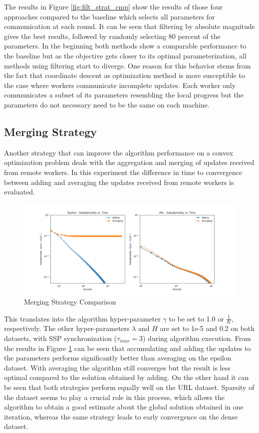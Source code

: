 The results in Figure \ref{fig:filt_strat_cmp} show the results of those four approaches compared to the baseline which selects all parameters for communication at each round.
It can be seen that filtering by absolute magnitude gives the best results, followed by randomly selecting 80 percent of the parameters.
In the beginning both methods show a comparable performance to the baseline but as the objective gets closer to its optimal parameterization, all methods using filtering start to diverge.
One reason for this behavior stems from the fact that coordinate descent as optimization method is more susceptible to the case where workers communicate incomplete updates.
Each worker only communicates a subset of its parameters resembling the local progress but the parameters do not necessary need to be the same on each machine.

\subsection{Merging Strategy}
\label{ss:merging_strategy}
Another strategy that can improve the algorithm performance on a convex optimization problem deals with the aggregation and merging of updates received from remote workers.
In this experiment the difference in time to convergence between adding and averaging the updates received from remote workers is evaluated.
\begin{figure}[ht]
\centering
\includegraphics[width=1.0\textwidth]{img/merg_strat_cmp.png}
\caption{Merging Strategy Comparison}
\label{fig:merg_strat_cmp}
\end{figure}
This translates into the algorithm hyper-parameter $\gamma$ to be set to 1.0 or $\frac{1}{K}$, respectively.
The other hyper-parameters $\lambda$ and $H$ are set to 1e-5 and 0.2 on both datasets, with SSP synchronization ($\tau_{max}=3$) during algorithm execution.
From the results in Figure \ref{fig:merg_strat_cmp} can be seen that accumulating and adding the updates to the parameters performs significantly better than averaging on the epsilon dataset.
With averaging the algorithm still converges but the result is less optimal compared to the solution obtained by adding.
On the other hand it can be seen that both strategies perform equally well on the URL dataset.
Sparsity of the dataset seems to play a crucial role in this process, which allows the algorithm to obtain a good estimate about the global solution obtained in one iteration, whereas the same strategy leads to early convergence on the dense dataset.
